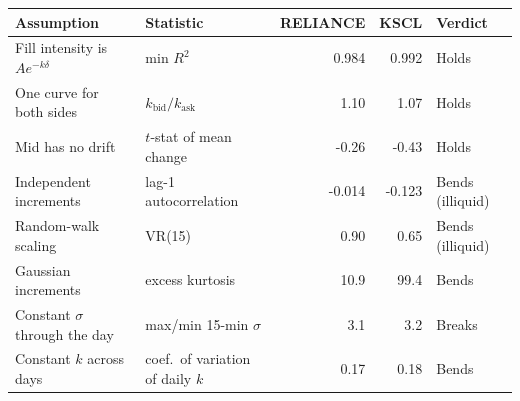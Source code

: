 \begin{tabular}{llrrl}
\toprule
Assumption & Statistic & RELIANCE & KSCL & Verdict \\
\midrule
Fill intensity is $Ae^{-k\delta}$ & min $R^2$ & 0.984 & 0.992 & Holds \\
One curve for both sides & $k_{\text{bid}}/k_{\text{ask}}$ & 1.10 & 1.07 & Holds \\
Mid has no drift & $t$-stat of mean change & -0.26 & -0.43 & Holds \\
Independent increments & lag-1 autocorrelation & -0.014 & -0.123 & Bends (illiquid) \\
Random-walk scaling & VR(15) & 0.90 & 0.65 & Bends (illiquid) \\
Gaussian increments & excess kurtosis & 10.9 & 99.4 & Bends \\
Constant $\sigma$ through the day & max/min 15-min $\sigma$ & 3.1 & 3.2 & Breaks \\
Constant $k$ across days & coef.\ of variation of daily $k$ & 0.17 & 0.18 & Bends \\
\bottomrule
\end{tabular}

